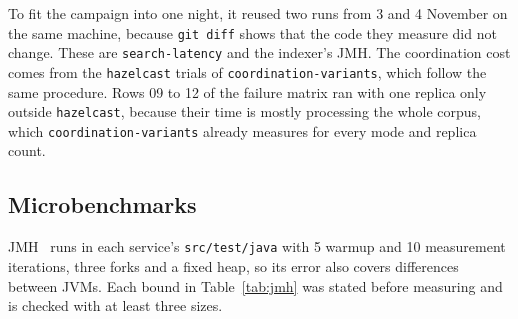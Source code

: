 \documentclass[11pt,a4paper]{article}
\newcommand{\code}[1]{\nolinkurl{#1}}
\newcommand{\mode}[1]{\code{#1}}
\begin{document}
To fit the campaign into one night, it reused two runs from 3 and 4 November on the same machine, because
\code{git diff} shows that the code they measure did not change. These are \code{search-latency} and the indexer's JMH.
The coordination cost comes from the \mode{hazelcast} trials of \code{coordination-variants}, which follow the same
procedure. Rows 09 to 12 of the failure matrix ran with one replica only outside \mode{hazelcast}, because their time is
mostly processing the whole corpus, which \code{coordination-variants} already measures for every mode and replica
count.

\subsection{Microbenchmarks}

JMH~\cite{jmh} runs in each service's \code{src/test/java} with 5 warmup and 10 measurement iterations, three forks and a fixed
heap, so its error also covers differences between JVMs. Each bound in Table~\ref{tab:jmh} was stated before measuring
and is checked with at least three sizes.
\end{document}
